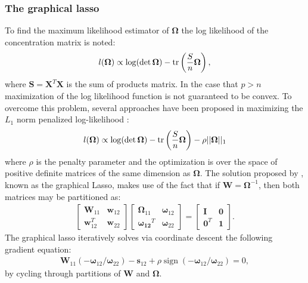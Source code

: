 \documentclass[11pt]{article}
\DeclareMathOperator{\tr}{tr}
\DeclareMathOperator{\sign}{sign}
\begin{document}
\subsubsection{The graphical lasso}
 To find the maximum likelihood estimator of $\boldsymbol{\Omega}$ the log likelihood of the concentration matrix is noted:
\begin{align} 
l(\boldsymbol{\Omega})\propto\log (\det \boldsymbol{\Omega})-\tr \left( \frac{\boldmath{S}}{n} \boldsymbol{\Omega} \right),
\end{align}
where $\textbf{S}=\textbf{X}^T \textbf{X}$ is the sum of products matrix. In the case that $p>n$ maximization of the log likelihood function is not guaranteed to be convex. To overcome this problem, several approaches have been proposed in maximizing the $L_1$ norm penalized log-likelihood \citep{friedman2007,yuan2007,banerjee2008}:
\begin{align}
l(\boldsymbol{\Omega})\propto\log (\det \boldsymbol{\Omega})-\tr \left( \boldmath{\frac{S}{n}} \boldsymbol{\Omega} \right)-\rho ||\boldsymbol{\Omega}||_1
\end{align}
where $\rho$ is the penalty parameter and the optimization is over the space of positive definite matrices of the same dimension as $\boldsymbol{\Omega}$.
The solution proposed by \cite{friedman2007}, known as the graphical Lasso, makes use of the fact that if $\textbf{W}=\boldsymbol{\Omega}^{-1}$, then both matrices may be partitioned as:
\begin{align}
\begin{bmatrix}
\textbf{W}_{11} & \textbf{w}_{12} \\
\textbf{w}_{12}^T & \textbf{w}_{22}
\end{bmatrix}
\begin{bmatrix}
\boldsymbol{\Omega}_{11} & \boldsymbol{\omega}_{12} \\
\boldsymbol{\omega_{12}}^T &  \boldsymbol{\omega}_{22}
\end{bmatrix}=
\begin{bmatrix}
\textbf{I} & \textbf{0} \\
\textbf{0}^T &  \textbf{1}
\end{bmatrix}.
\end{align} 
The graphical lasso iteratively solves via coordinate descent the following gradient equation:
\begin{align}
\textbf{W}_{11}(-\boldsymbol{\omega}_{12}/\boldsymbol{\omega}_{22})-\textbf{s}_{12}+\rho \sign(-\boldsymbol{\omega}_{12}/\boldsymbol{\omega}_{22})=0,
\end{align}
by cycling through partitions of $\textbf{W}$ and $\boldsymbol{\Omega}$.
\end{document}
